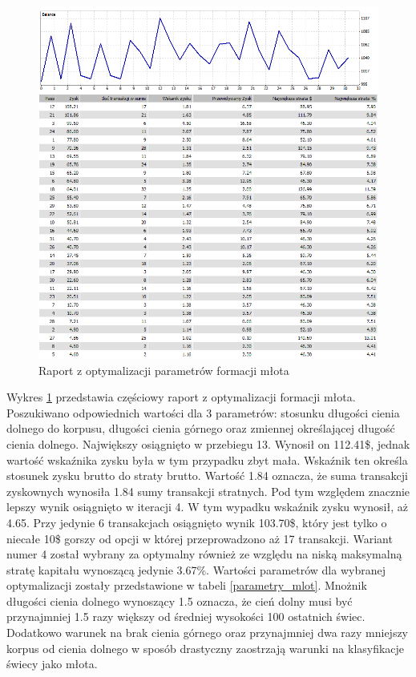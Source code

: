 \documentclass[pdflatex,11pt]{aghdpl}
\begin{document}
\begin{figure}[h!]
\begin{center}
\includegraphics[width=14cm]{hammer/optymalizacja.png}
\caption{Raport z optymalizacji parametrów formacji młota}
\label{opt_mlot}
\end{center}
\end{figure} 
Wykres \ref{opt_mlot} przedstawia częściowy raport z optymalizacji formacji młota. Poszukiwano odpowiednich wartości dla 3 parametrów: stosunku długości cienia dolnego do korpusu, długości cienia górnego oraz zmiennej określającej długość cienia dolnego. Największy osiągnięto w przebiegu 13. Wynosił on 112.41\$, jednak wartość wskaźnika zysku była w tym przypadku zbyt mała. Wskaźnik ten określa stosunek zysku brutto do straty brutto. Wartość 1.84 oznacza, że suma transakcji zyskownych wynosiła 1.84 sumy transakcji stratnych. Pod tym względem znacznie lepszy wynik osiągnięto w iteracji 4. W tym wypadku wskaźnik zysku wynosił, aż 4.65. Przy jedynie 6 transakcjach osiągnięto wynik 103.70\$, który jest tylko o niecałe 10\$ gorszy od opcji w której przeprowadzono aż 17 transakcji. Wariant numer 4 został wybrany za optymalny również ze względu na niską maksymalną stratę kapitału wynoszącą jedynie 3.67\%. Wartości parametrów dla wybranej optymalizacji zostały przedstawione w tabeli \ref{parametry_mlot}. Mnożnik długości cienia dolnego wynoszący 1.5 oznacza, że cień dolny musi być przynajmniej 1.5 razy większy od średniej wysokości 100 ostatnich świec. Dodatkowo warunek na brak cienia górnego oraz przynajmniej dwa razy mniejszy korpus od cienia dolnego w sposób drastyczny zaostrzają warunki na klasyfikacje świecy jako młota. 
\end{document}
